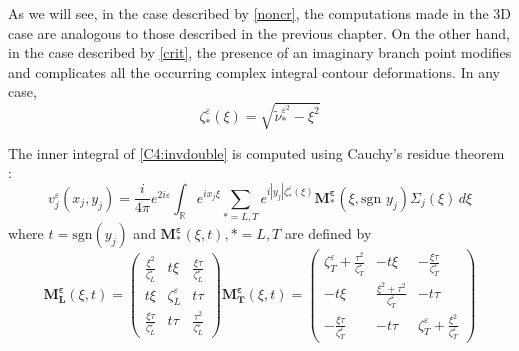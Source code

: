 As we will see, in the case described by \eqref{noncr}, the computations made in the 3D case are analogous to those described in the previous chapter. On the other hand, in the case described by \eqref{crit}, the presence of an imaginary branch point modifies and complicates all the occurring complex integral contour deformations. In any case,
\begin{equation}
\zeta_*^{\varepsilon}(\xi)=\sqrt{\tilde{\nu}_*^{\varepsilon^2}-\xi^2}
\label{C4:defzeta}
\end{equation}

The inner integral of \eqref{C4:invdouble} is computed using Cauchy's residue theorem :
\begin{equation}
v_j^{\varepsilon}(x_j,y_j)=\frac{i}{4\pi}e^{2i\varepsilon}\int_{\mathbb{R}} e^{ix_j\xi}\sum_{*=L,T}e^{i|y_j|\zeta_*^{\varepsilon}(\xi)}\mathbf{M_*^{\varepsilon}}(\xi,\mbox{sgn }y_j)\Sigma_j(\xi)\,d\xi
\label{C4:vjeps}
\end{equation}
where $t=\mbox{sgn}( y_j)$ and $\mathbf{M_*^{\varepsilon}}(\xi,t), *=L,T$ are defined by
\begin{subequations}
\begin{equation}
\mathbf{M_L^{\varepsilon}}(\xi,t)=\begin{pmatrix}
\frac{\xi^2}{\zeta_L^{\varepsilon}} &t\xi & \frac{\xi\tau}{\zeta_L^{\varepsilon}} \\
t\xi & \zeta_L^{\varepsilon} & t\tau \\
\frac{\xi\tau}{\zeta_L^{\varepsilon}}& t\tau & \frac{\tau^2}{\zeta_L^{\varepsilon}}
\end{pmatrix}
\label{C4:MLeps}
\end{equation}
\begin{equation}
\mathbf{M_T^{\varepsilon}}(\xi,t)=\begin{pmatrix}
\zeta_T^{\varepsilon} +\frac{\tau^2}{\zeta_T^{\varepsilon}}& -t\xi &-\frac{\xi\tau}{\zeta_T^{\varepsilon}}\\
-t\xi & \frac{\xi^2+\tau^2}{\zeta_T^{\varepsilon}}&-t\tau \\
-\frac{\xi\tau}{\zeta_T^{\varepsilon}}&-t\tau&\zeta_T^{\varepsilon} +\frac{\xi^2}{\zeta_T^{\varepsilon}}
\end{pmatrix}
\label{C4:MTeps}
\end{equation}
\label{C4:M*eps}
\end{subequations}


